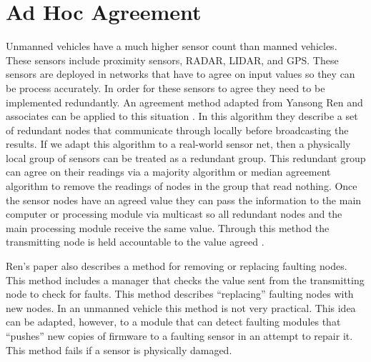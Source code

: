 \documentclass[twoside, conference]{IEEEtran}
\begin{document}
\section{Ad Hoc Agreement}\label{sec:adhoc-agreement}
Unmanned vehicles have a much higher sensor count than manned vehicles. These sensors include proximity sensors, RADAR, LIDAR, and GPS. These sensors are deployed in networks that have to agree on input values so they can be process accurately. In order for these sensors to agree they need to be implemented redundantly. An agreement method adapted from Yansong Ren and associates can be applied to this situation \cite{Ren2001}. In this algorithm they describe a set of redundant nodes that communicate through locally before broadcasting the results. If we adapt this algorithm to a real-world sensor net, then a physically local group of sensors can be treated as a redundant group. This redundant group can agree on their readings via a majority algorithm or median agreement algorithm to remove the readings of nodes in the group that read nothing. Once the sensor nodes have an agreed value they can pass the information to the main computer or processing module via multicast so all redundant nodes and the main processing module receive the same value. Through this method the transmitting node is held accountable to the value agreed \cite{Ren2001}.

Ren's paper also describes a method for removing or replacing faulting nodes. This method includes a manager that checks the value sent from the transmitting node to check for faults. This method describes ``replacing'' faulting nodes with new nodes. In an unmanned vehicle this method is not very practical. This idea can be adapted, however, to a module that can detect faulting modules that ``pushes'' new copies of firmware to a faulting sensor in an attempt to repair it. This method fails if a sensor is physically damaged.\cite{Ren2001}
\end{document}
